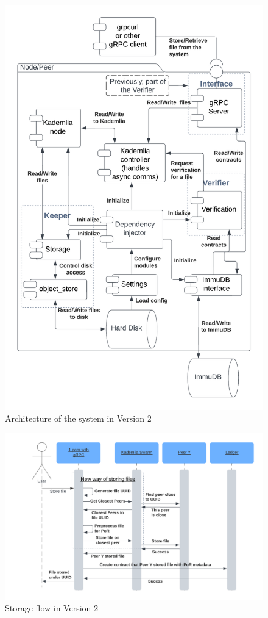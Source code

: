 \begin{figure}
    \centering
    \includegraphics[width=1\textwidth]{gfx/arch-v2.png}
    \caption{Architecture of the system in Version 2}
    \label{fig:architecture-v2}
\end{figure}

\begin{figure}
    \centering
    \includegraphics[width=1\textwidth]{gfx/store-procedure-v2.png}
    \caption{Storage flow in Version 2}
    \label{fig:store-procedure-v2}
\end{figure}

